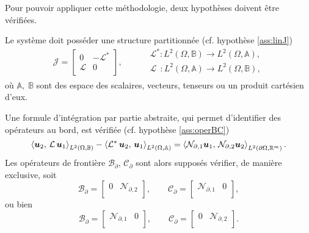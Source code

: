 Pour pouvoir appliquer cette méthodologie, deux hypothèses doivent être vérifiées. 
\begin{hypothese}\label{ass:linJ_fr}
Le système doit posséder une structure partitionnée (cf. hypothèse \ref{ass:linJ})
\begin{equation*}
\mathcal{J} = 
\begin{bmatrix}
0 & -\mathcal{L}^* \\
\mathcal{L} & 0 \\
\end{bmatrix}, \qquad 
\begin{aligned}
&\mathcal{L}^* : L^2(\Omega, \mathbb{B}) \rightarrow L^2(\Omega, \mathbb{A}), \\
&\mathcal{L}\;\, : L^2(\Omega, \mathbb{A}) \rightarrow L^2(\Omega, \mathbb{B}), \\
\end{aligned}
\end{equation*}
où $\mathbb{A}, \; \mathbb{B}$ sont des espace des scalaires, vecteurs, tenseurs ou un produit cartésien d'eux. 
\end{hypothese}

\begin{hypothese}\label{ass:operBC_fr}
Une formule d'intégration par partie abstraite, qui permet d'identifier des opérateurs au bord, est vérifiée (cf. hypothèse \ref{ass:operBC})
\begin{equation*}
\inner[L^2(\Omega, \mathbb{B})]{\bm{u}_2}{\mathcal{L}\,\bm{u}_1} - \inner[L^2(\Omega, \mathbb{A})]{\mathcal{L}^* \, \bm{u}_2}{\bm{u}_1} = \inner[L^2(\partial \Omega, \mathbb{R}^m)]{\mathcal{N}_{\partial, 1} \bm{u}_1}{\mathcal{N}_{\partial, 2} \bm{u}_2}.
\end{equation*}
Les opérateurs de frontière $\mathcal{B}_\partial, \, \mathcal{C}_\partial$ sont alors supposés vérifier, de manière exclusive, soit
\begin{equation*}
\mathcal{B}_\partial = \begin{bmatrix}
0 & \mathcal{N}_{\partial, 2} \\
\end{bmatrix}, \qquad 
\mathcal{C}_\partial = \begin{bmatrix}
\mathcal{N}_{\partial, 1} & 0 \\
\end{bmatrix},
\end{equation*}
ou bien 
\begin{equation*}
\mathcal{B}_\partial = \begin{bmatrix}
\mathcal{N}_{\partial, 1} & 0 \\
\end{bmatrix}, \qquad \mathcal{C}_\partial = \begin{bmatrix}
0 & \mathcal{N}_{\partial, 2} \\
\end{bmatrix}.
\end{equation*}
\end{hypothese}

